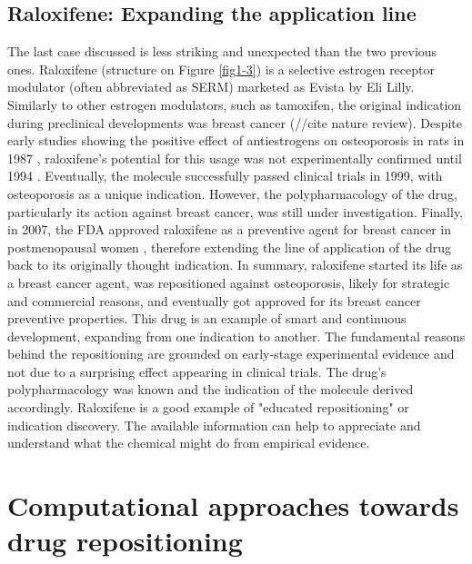 \subsection{Raloxifene: Expanding the application line}

The last case discussed is less striking and unexpected than the two previous ones. Raloxifene (structure on Figure \ref{fig1-3}) is a selective estrogen receptor modulator (often abbreviated as SERM) marketed as Evista by Eli Lilly. Similarly to other estrogen modulators, such as tamoxifen, the original indication during preclinical developments was breast cancer (//cite nature review). Despite early studies showing the positive effect of antiestrogens on osteoporosis in rats in 1987 \citep{jordan1987effects}, raloxifene's potential for this usage was not experimentally confirmed until 1994 \citep{black1994raloxifene}. Eventually, the molecule successfully passed clinical trials in 1999, with osteoporosis as a unique indication. However, the polypharmacology of the drug, particularly its action against breast cancer, was still under investigation. Finally, in 2007, the FDA approved raloxifene as a preventive agent for breast cancer in postmenopausal women \citep{fdaraloxifen}, therefore extending the line of application of the drug back to its originally thought indication. In summary, raloxifene started its life as a breast cancer agent, was repositioned against osteoporosis, likely for strategic and commercial reasons, and eventually got approved for its breast cancer preventive properties. This drug is an example of smart and continuous development, expanding from one indication to another. The fundamental reasons behind the repositioning are grounded on early-stage experimental evidence and not due to a surprising effect appearing in clinical trials. The drug's polypharmacology was known and the indication of the molecule derived accordingly. Raloxifene is a good example of "educated repositioning" or indication discovery. The available information can help to appreciate and understand what the chemical might do from empirical evidence.

\section{Computational approaches towards drug repositioning}
\label{approaches}

